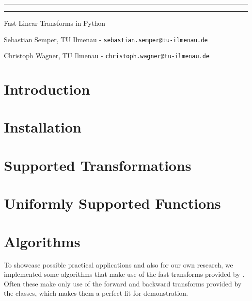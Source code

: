\documentclass[10pt,english,twoside]{article}
\begin{document}
\begin{center}

\thispagestyle{empty}
\vspace{13mm}

\hrule

\vspace{13mm}
\Huge{\fm{}}
\vspace{13mm}

\hrule

\vspace{3mm}
\Large{Fast Linear Transforms in Python}
\vspace{3mm}
%
%

\normalsize Sebastian Semper, TU Ilmenau -
            \texttt{sebastian.semper@tu-ilmenau.de}

\normalsize Christoph Wagner, TU Ilmenau -
            \texttt{christoph.wagner@tu-ilmenau.de}

\end{center}
%
%
\newpage
%
\tableofcontents 
%
\newpage
%
%
\begin{multicols}{2}
\section{Introduction}

%
%
%
\section{Installation}

%
%
%
\section{Supported Transformations}

%
%
%
\section{Uniformly Supported Functions}

%
%
%
\section{Algorithms}
%
To showcase possible practical applications and also for our own research, we
implemented some algorithms that make use of the fast transforms provided by
\fm{}. Often these make only use of the forward and backward transforms
provided by the \fm{} classes, which makes them a perfect fit for demonstration.
%

%
%
%
\end{multicols}
\end{document}
